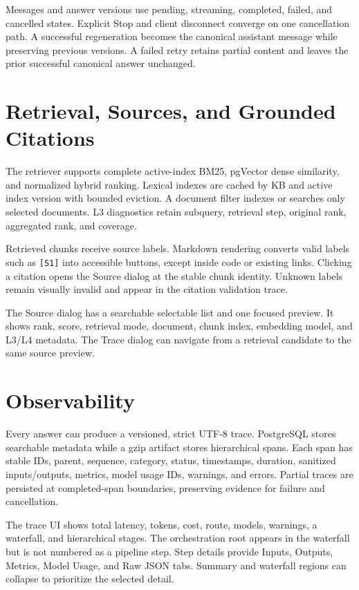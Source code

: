 

Messages and answer versions use pending, streaming, completed, failed, and
cancelled states. Explicit Stop and client disconnect converge on one
cancellation path. A successful regeneration becomes the canonical assistant
message while preserving previous versions. A failed retry retains partial
content and leaves the prior successful canonical answer unchanged.

\section{Retrieval, Sources, and Grounded Citations}

The retriever supports complete active-index BM25, pgVector dense similarity,
and normalized hybrid ranking. Lexical indexes are cached by KB and active
index version with bounded eviction. A document filter indexes or searches only
selected documents. L3 diagnostics retain subquery, retrieval step, original
rank, aggregated rank, and coverage.

Retrieved chunks receive source labels. Markdown rendering converts valid
labels such as \texttt{[S1]} into accessible buttons, except inside code or
existing links. Clicking a citation opens the Source dialog at the stable chunk
identity. Unknown labels remain visually invalid and appear in the citation
validation trace.

The Source dialog has a searchable selectable list and one focused preview.
It shows rank, score, retrieval mode, document, chunk index, embedding model,
and L3/L4 metadata. The Trace dialog can navigate from a retrieval candidate
to the same source preview.

\section{Observability}

Every answer can produce a versioned, strict UTF-8 trace. PostgreSQL stores
searchable metadata while a gzip artifact stores hierarchical spans. Each span
has stable IDs, parent, sequence, category, status, timestamps, duration,
sanitized inputs/outputs, metrics, model usage IDs, warnings, and errors.
Partial traces are persisted at completed-span boundaries, preserving evidence
for failure and cancellation.



The trace UI shows total latency, tokens, cost, route, models, warnings, a
waterfall, and hierarchical stages. The orchestration root appears in the
waterfall but is not numbered as a pipeline step. Step details provide Inputs,
Outputs, Metrics, Model Usage, and Raw JSON tabs. Summary and waterfall regions
can collapse to prioritize the selected detail.

